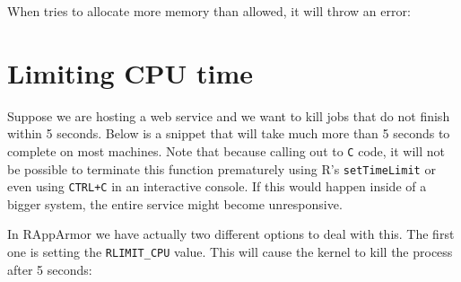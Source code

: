 \begin{appendix}
When \R tries to allocate more memory than allowed, it will throw an error:

\begin{knitrout}\mycodesize
{}\color{fgcolor}\begin{kframe}
\begin{alltt}
 \hlkwb{<-} \hlstd{(}\hlstd{(),}  \hlstd{=}  \hlopt{*}  \hlopt{*} \hlstd{)}
\end{alltt}


{\ttfamily\noindent\bfseries\color{errorcolor}{\#\# Error: cannot allocate vector of size 76.3 Mb}}


\end{kframe}
\end{knitrout}



\section{Limiting CPU time}
\label{cputime}

Suppose we are hosting a web service and we want to kill jobs that do not
finish within 5 seconds. Below is a snippet that will take much more than 5
seconds to complete on most machines. Note that because \R calling out to
\texttt{C} code, it will not be possible to terminate this function prematurely
using R's \texttt{setTimeLimit} or even using \texttt{CTRL+C} in an interactive
console. If this would happen inside of a bigger system, the entire service
might become unresponsive.

\begin{knitrout}\mycodesize
{}\color{fgcolor}\begin{kframe}
\begin{alltt}
 \hlkwb{<-} \hlstd{() \{}
     \hlkwb{<-} \hlstd{(}\hlstd{(}\hlstd{),} \hlstd{)}
     \hlkwb{<-} 
\hlstd{\}}
\end{alltt}
\end{kframe}
\end{knitrout}


In RAppArmor we have actually two different options to deal with this. The first
one is setting the \texttt{RLIMIT\_CPU} value. This will cause the kernel to
kill the process after 5 seconds:


\end{appendix}
